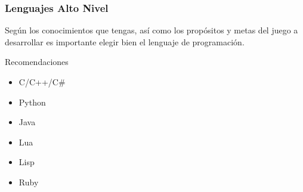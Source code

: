 
\begin{frame}
	\frametitle{Lenguajes Alto Nivel}
	
	Según los conocimientos que tengas, así como los propósitos y metas del juego a desarrollar es importante elegir bien el lenguaje de programación.
		
	\begin{block}{Recomendaciones}
		\begin{itemize}
			\item C/C++/C\#
			\item Python
			\item Java
			\item Lua
			\item Lisp
			\item Ruby
		\end{itemize}
	\end{block}

\end{frame}


